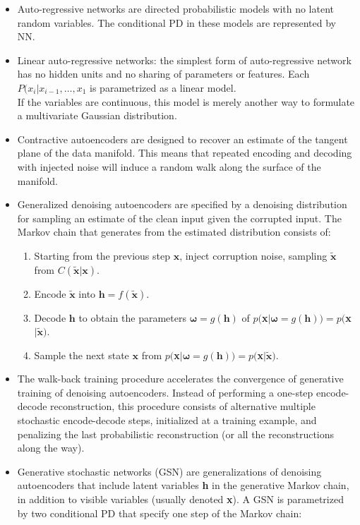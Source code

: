\documentclass{article}
\begin{document}
\begin{itemize}
\item Auto-regressive networks are directed probabilistic models with no latent random variables. The conditional PD in these models are represented by NN.
\item Linear auto-regressive networks: the simplest form of auto-regressive network has no hidden units and no sharing of parameters or features. Each \(P(x_i|x_{i-1}, \dots, x_1\) is parametrized as a linear model.\\If the variables are continuous, this model is merely another way to formulate a multivariate Gaussian distribution.
\item Contractive autoencoders are designed to recover an estimate of the tangent plane of the data manifold. This means that repeated encoding and decoding with injected noise will induce a random walk along the surface of the manifold.
\item Generalized denoising autoencoders are specified by a denoising distribution for sampling an estimate of the clean input given the corrupted input. The Markov chain that generates from the estimated distribution consists of:
\begin{enumerate}
\item Starting from the previous step \(\boldsymbol{x}\), inject corruption noise, sampling \(\tilde{\boldsymbol{x}}\) from \(C(\tilde{\boldsymbol{x}}|\boldsymbol{x})\).
\item Encode \(\tilde{\boldsymbol{x}}\) into \(\boldsymbol{h}=f(\tilde{\boldsymbol{x}})\).
\item Decode \(\boldsymbol{h}\) to obtain the parameters \(\boldsymbol{\omega}=g(\boldsymbol{h})\) of \(p(\)\textbf{x}\(|\boldsymbol{\omega}=g(\boldsymbol{h}))=p(\)\textbf{x}\(|\tilde{\boldsymbol{x}})\).
\item Sample the next state \(\boldsymbol{x}\) from \(p(\)\textbf{x}\(|\boldsymbol{\omega}=g(\boldsymbol{h}))=p(\)\textbf{x}\(|\tilde{\boldsymbol{x}})\).
\end{enumerate}
\item The walk-back training procedure accelerates the convergence of generative training of denoising autoencoders. Instead of performing a one-step encode-decode reconstruction, this procedure consists of alternative multiple stochastic encode-decode steps, initialized at a training example, and penalizing the last probabilistic reconstruction (or all the reconstructions along the way).
\item Generative stochastic networks (GSN) are generalizations of denoising autoencoders that include latent variables \textbf{h} in the generative Markov chain, in addition to visible variables (usually denoted \textbf{x}). A GSN is parametrized by two conditional PD that specify one step of the Markov chain:

\end{itemize}
\end{document}
